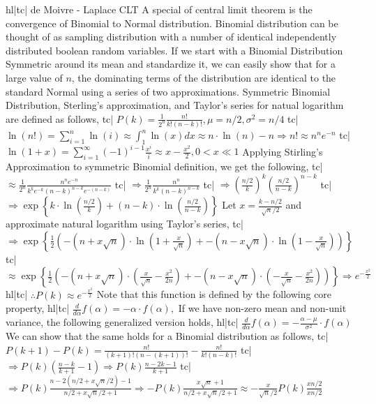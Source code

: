 hl|tc| de Moivre - Laplace CLT
A special of central limit theorem is the convergence of Binomial to Normal distribution. Binomial distribution can be thought of as sampling distribution with a number of identical independently distributed boolean random variables.
If we start with a Binomial Distribution Symmetric around its mean and standardize it, we can easily show that for a large value of \(n\), the dominating terms of the distribution are identical to the standard Normal using a series of two approximations.
Symmetric Binomial Distribution, Sterling's approximation, and Taylor's series for natual logarithm are defined as follows,
tc| \( P(k) = \frac{1}{2^n} \frac{n!}{k!(n-k)!}, \mu = n/2, \sigma^2 = n/4 \)
tc| \( \ln(n!) = \sum_{i=1}^{n} \ln(i) \approx \int^n_1 \ln(x) dx \approx n \cdot \ln(n) - n \Rightarrow n! \approx n^n e^{-n} \)
tc| \( \ln(1+x) = \sum_{i=1}^{\infty} {(-1)}^{i-1}\frac{x^i}{i} \approx x - \frac{x^2}{2}, 0 \lt x \ll 1 \)
Applying Stirling's Approximation to symmetric Binomial definition, we get the following,
tc| \( \approx \frac{1}{2^n} \frac{n^n e^{-n}}{k^k e^{-k} (n-k)^{n-k} e^{-(n-k)}} \)
tc| \( \Rightarrow \frac{1}{2^n} \frac{n^n}{k^k(n-k)^{n-k}} \)
tc| \( \Rightarrow \left(\frac{n/2}{k}\right)^k \left(\frac{n/2}{n-k}\right)^{n-k} \)
tc| \( \Rightarrow \exp\left\{ k \cdot \ln\left(\frac{n/2}{k}\right) + (n-k) \cdot \ln\left(\frac{n/2}{n-k}\right) \right\} \)
Let \(x = \frac{k - n/2}{\sqrt{n}/2}\) and approximate natural logarithm using Taylor's series,
tc| \( \Rightarrow \exp\left\{\frac{1}{2}\left(-(n + x\sqrt{n}) \cdot \ln\left(1+\frac{x}{\sqrt{n}}\right) + -(n - x\sqrt{n}) \cdot \ln\left(1-\frac{x}{\sqrt{n}}\right) \right)\right\} \)
tc| \( \approx \exp\left\{\frac{1}{2}\left(-(n + x\sqrt{n}) \cdot \left(\frac{x}{\sqrt{n}} - \frac{x^2}{2n}\right) + -(n - x\sqrt{n}) \cdot \left(-\frac{x}{\sqrt{n}} - \frac{x^2}{2n}\right) \right)\right\} \Rightarrow e^{-\frac{x^2}{2}} \)
hl|tc| \( \therefore P(k) \approx e^{-\frac{x^2}{2}} \)
Note that this function is defined by the following core property,
hl|tc| \( \frac{d}{d\alpha}f(\alpha)= -\alpha \cdot f(\alpha), \)
If we have non-zero mean and non-unit variance, the following generalized version holds,
hl|tc| \( \frac{d}{d\alpha}f(\alpha)= -\frac{\alpha-\mu}{\sigma^2} \cdot f(\alpha) \)
We can show that the same holds for a Binomial distribution as follows,
tc| \( P(k+1) - P(k) = \frac{n!}{(k+1)!(n-(k+1))!} - \frac{n!}{k!(n-k)!} \)
tc| \( \Rightarrow P(k)\left(\frac{n-k}{k+1} - 1\right) \Rightarrow P(k)\frac{n-2k-1}{k+1} \)
tc| \( \Rightarrow P(k)\frac{n-2(n/2 + x\sqrt{n}/2)-1}{n/2 + x\sqrt{n}/2 +1} \Rightarrow -P(k)\frac{x\sqrt{n} + 1}{n/2 + x\sqrt{n}/2 + 1} \approx -\frac{x}{\sqrt{n}/2}P(k)\frac{xn/2}{xn/2} \)
